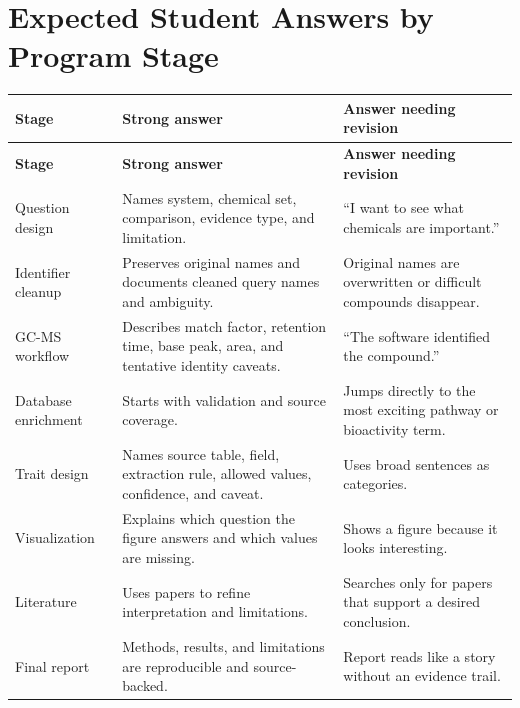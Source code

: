 \section{Expected Student Answers by Program Stage}
\begin{longtable}{p{}p{}p{}}
\toprule
\textbf{Stage} & \textbf{Strong answer} & \textbf{Answer needing revision}\\
\midrule
\endfirsthead
\toprule
\textbf{Stage} & \textbf{Strong answer} & \textbf{Answer needing revision}\\
\midrule
\endhead
Question design & Names system, chemical set, comparison, evidence type, and limitation. & ``I want to see what chemicals are important.''\\
Identifier cleanup & Preserves original names and documents cleaned query names and ambiguity. & Original names are overwritten or difficult compounds disappear.\\
GC-MS workflow & Describes match factor, retention time, base peak, area, and tentative identity caveats. & ``The software identified the compound.''\\
Database enrichment & Starts with validation and source coverage. & Jumps directly to the most exciting pathway or bioactivity term.\\
Trait design & Names source table, field, extraction rule, allowed values, confidence, and caveat. & Uses broad sentences as categories.\\
Visualization & Explains which question the figure answers and which values are missing. & Shows a figure because it looks interesting.\\
Literature & Uses papers to refine interpretation and limitations. & Searches only for papers that support a desired conclusion.\\
Final report & Methods, results, and limitations are reproducible and source-backed. & Report reads like a story without an evidence trail.\\
\bottomrule
\end{longtable}

